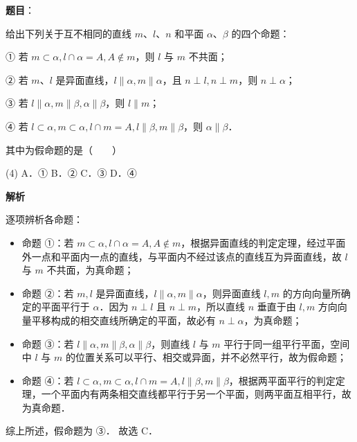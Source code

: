 \begin{answer}

\textbf{题目}：

给出下列关于互不相同的直线 $m$、$l$、$n$ 和平面 $\alpha$、$\beta$ 的四个命题：

① 若 $m \subset \alpha, l \cap \alpha = A, A \notin m$，则 $l$ 与 $m$ 不共面；

② 若 $m$、$l$ 是异面直线，$l \parallel \alpha, m \parallel \alpha$，且 $n \perp l, n \perp m$，则 $n \perp \alpha$；

③ 若 $l \parallel \alpha, m \parallel \beta, \alpha \parallel \beta$，则 $l \parallel m$；

④ 若 $l \subset \alpha, m \subset \alpha, l \cap m = A, l \parallel \beta, m \parallel \beta$，则 $\alpha \parallel \beta$．

其中为假命题的是\mbox{（　　）}

\begin{gkopts}(4)
\task A．①
\task B．②
\task C．③
\task D．④
\end{gkopts}

\textbf{解析}

逐项辨析各命题：
\begin{itemize}
\item 命题 ①：若 $m \subset \alpha, l \cap \alpha = A, A \notin m$，根据异面直线的判定定理，经过平面外一点和平面内一点的直线，与平面内不经过该点的直线互为异面直线，故 $l$ 与 $m$ 不共面，为真命题；
\item 命题 ②：若 $m, l$ 是异面直线，$l \parallel \alpha, m \parallel \alpha$，则异面直线 $l, m$ 的方向向量所确定的平面平行于 $\alpha$．因为 $n \perp l$ 且 $n \perp m$，所以直线 $n$ 垂直于由 $l, m$ 方向向量平移构成的相交直线所确定的平面，故必有 $n \perp \alpha$，为真命题；
\item 命题 ③：若 $l \parallel \alpha, m \parallel \beta, \alpha \parallel \beta$，则直线 $l$ 与 $m$ 平行于同一组平行平面，空间中 $l$ 与 $m$ 的位置关系可以平行、相交或异面，并不必然平行，故为假命题；
\item 命题 ④：若 $l \subset \alpha, m \subset \alpha, l \cap m = A, l \parallel \beta, m \parallel \beta$，根据两平面平行的判定定理，一个平面内有两条相交直线都平行于另一个平面，则两平面互相平行，故为真命题．
\end{itemize}

综上所述，假命题为 ③．
故选 C．


\end{answer}
